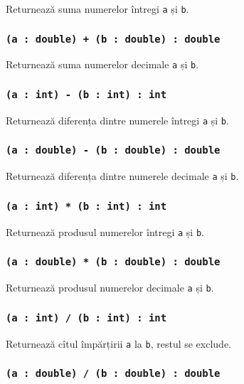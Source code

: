 Returnează suma numerelor întregi \texttt{a} și \texttt{b}.

\subsubsection{\texttt{(a : double) + (b : double) : double}}

Returnează suma numerelor decimale \texttt{a} și \texttt{b}.

\subsubsection{\texttt{(a : int) - (b : int) : int}}

Returnează diferența dintre numerele întregi \texttt{a} și \texttt{b}.

\subsubsection{\texttt{(a : double) - (b : double) : double}}

Returnează diferența dintre numerele decimale \texttt{a} și \texttt{b}.

\subsubsection{\texttt{(a : int) * (b : int) : int}}

Returnează produsul numerelor întregi \texttt{a} și \texttt{b}.

\subsubsection{\texttt{(a : double) * (b : double) : double}}

Returnează produsul numerelor decimale \texttt{a} și \texttt{b}.

\subsubsection{\texttt{(a : int) / (b : int) : int}}

Returnează cîtul împărțirii \texttt{a} la \texttt{b}, restul se exclude.

\subsubsection{\texttt{(a : double) / (b : double) : double}}

